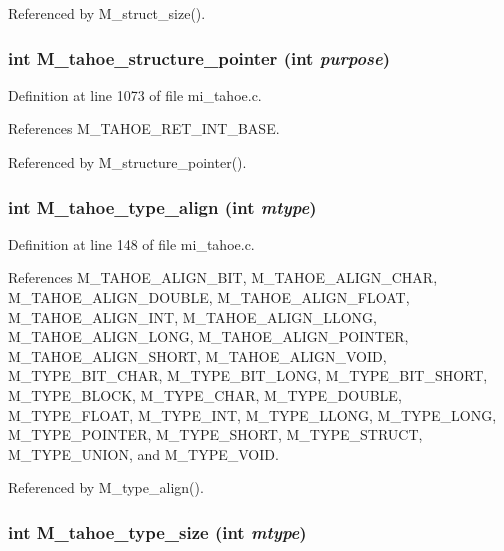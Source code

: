Referenced by M\_\-struct\_\-size().
\subsubsection{\setlength{\rightskip}{0pt plus 5cm}int M\_\-tahoe\_\-structure\_\-pointer (int {\em purpose})}\label{mi__tahoe_8c_91ba5045032bb2398a6e709689f97b14}




Definition at line 1073 of file mi\_\-tahoe.c.

References M\_\-TAHOE\_\-RET\_\-INT\_\-BASE.

Referenced by M\_\-structure\_\-pointer().
\subsubsection{\setlength{\rightskip}{0pt plus 5cm}int M\_\-tahoe\_\-type\_\-align (int {\em mtype})}\label{mi__tahoe_8c_fd9875093aee6434bea63d135da74db9}




Definition at line 148 of file mi\_\-tahoe.c.

References M\_\-TAHOE\_\-ALIGN\_\-BIT, M\_\-TAHOE\_\-ALIGN\_\-CHAR, M\_\-TAHOE\_\-ALIGN\_\-DOUBLE, M\_\-TAHOE\_\-ALIGN\_\-FLOAT, M\_\-TAHOE\_\-ALIGN\_\-INT, M\_\-TAHOE\_\-ALIGN\_\-LLONG, M\_\-TAHOE\_\-ALIGN\_\-LONG, M\_\-TAHOE\_\-ALIGN\_\-POINTER, M\_\-TAHOE\_\-ALIGN\_\-SHORT, M\_\-TAHOE\_\-ALIGN\_\-VOID, M\_\-TYPE\_\-BIT\_\-CHAR, M\_\-TYPE\_\-BIT\_\-LONG, M\_\-TYPE\_\-BIT\_\-SHORT, M\_\-TYPE\_\-BLOCK, M\_\-TYPE\_\-CHAR, M\_\-TYPE\_\-DOUBLE, M\_\-TYPE\_\-FLOAT, M\_\-TYPE\_\-INT, M\_\-TYPE\_\-LLONG, M\_\-TYPE\_\-LONG, M\_\-TYPE\_\-POINTER, M\_\-TYPE\_\-SHORT, M\_\-TYPE\_\-STRUCT, M\_\-TYPE\_\-UNION, and M\_\-TYPE\_\-VOID.

Referenced by M\_\-type\_\-align().
\subsubsection{\setlength{\rightskip}{0pt plus 5cm}int M\_\-tahoe\_\-type\_\-size (int {\em mtype})}\label{mi__tahoe_8c_bfa07e005fe8c5bae9b7f368ba970f78}





